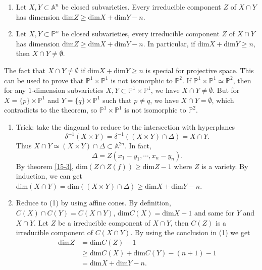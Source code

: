 \begin{theorem}\label{16-1}
  {}
  \noindent
	\begin{enumerate}
		\item Let $ X,Y\subset \mathbb{A}^n $ be closed subvarieties. Every irreducible component $ Z $ of $ X\cap Y $ has dimension $ \mathrm{dim}Z\geq \mathrm{dim}X+\mathrm{dim}Y-n $.
		\item Let $ X,Y\subset \mathbb{P}^n $ be closed subvarieties, every irreducible component $ Z $ of $ X\cap Y $ has dimension $ \mathrm{dim}Z\geq \mathrm{dim}X+\mathrm{dim}Y-n $. In particular, if $ \mathrm{dim}X+\mathrm{dim}Y\geq n $, then $ X\cap Y\neq \emptyset $.
	\end{enumerate}
\end{theorem}

\begin{remark}
	The fact that $ X\cap Y\neq \emptyset $ if $\mathrm{dim}X+\mathrm{dim}Y\geq n $ is special for projective space. This can be used to prove that $ \mathbb{P}^1\times\mathbb{P}^1 $ is not isomorphic to $ \mathbb{P}^2 $. If $ \mathbb{P}^1\times\mathbb{P}^1 \simeq \mathbb{P}^2$, then for any $ 1 $-dimension subvarieties $ X,Y \subset \mathbb{P}^1\times \mathbb{P}^1$, we have $ X\cap Y \neq \emptyset $. But for $ X=\lbrace p\rbrace\times \mathbb{P}^1$ and $ Y=\lbrace q\rbrace \times \mathbb{P}^1 $ such that $ p\neq q $, we have $ X\cap Y=\emptyset $, which contradicts to the theorem, so $ \mathbb{P}^1\times\mathbb{P}^1 $ is not isomorphic to $ \mathbb{P}^2 $.
\end{remark}
	\begin{enumerate}
		\item Trick: take the diagonal to reduce to the intersection with hyperplanes
		      $$
			      \delta^{-1}(X\times Y)=\delta^{-1}((X\times Y)\cap \Delta)=X\cap Y.
		      $$
		      Thus $ X\cap Y\simeq (X\times Y)\cap \Delta\subset \mathbb{A}^{2n} $. In fact,
		      $$
			      \Delta =Z(x_1-y_1,\cdots,x_n-y_n).
		      $$
		      By theorem \ref{15-3}, $ \mathrm{dim}(Z\cap Z(f))\geq \mathrm{dim}Z-1 $ where $ Z $ is a variety. By induction, we can get $ \mathrm{dim}(X\cap Y)=\mathrm{dim}((X\times Y)\cap \Delta)\geq \mathrm{dim}X+\mathrm{dim}Y-n $.
		\item Reduce to (1) by using affine cones. By definition, $ C(X)\cap C(Y)=C(X\cap Y) $, $ \mathrm{dim}C(X)=\mathrm{dim}X+1 $ and same for $ Y $ and $ X\cap Y $. Let $ Z $ be a irreducible component of $ X\cap Y $, then $ C(Z) $ is a irreducible component of $ C(X\cap Y) $.  By using the conclusion in (1) we get
		      \begin{align*}
			      \mathrm{dim}Z & =     \mathrm{dim}C(Z)-1                             \\
			                    & \geq  \mathrm{dim}C(X)+\mathrm{dim}C(Y)-(n+1)-1  { } \\
			                    & =     \mathrm{dim}X+\mathrm{dim}Y-n.
		      \end{align*}
	\end{enumerate}

